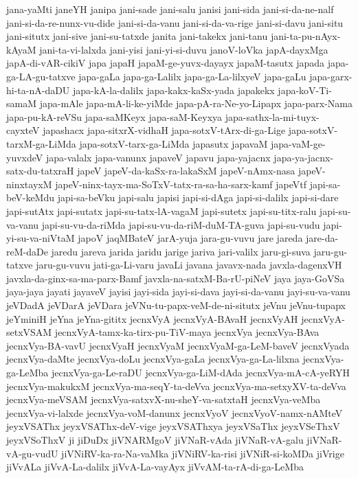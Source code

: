 {jana-yaMti
janeYH
janipa
jani-sade
jani-salu
janisi
jani-sida
jani-si-da-ne-nalf
jani-si-da-re-nunx-vu-dide
jani-si-da-vanu
jani-si-da-va-rige
jani-si-davu
jani-situ
jani-situtx
jani-sive
jani-su-tatxde
janita
jani-takekx
jani-tanu
jani-ta-pu-nAyx-kAyaM
jani-ta-vi-lalxda
jani-yisi
jani-yi-si-duvu
janoV-loVka
japA-dayxMga
japA-di-vAR-cikiV
japa
japaH
japaM-ge-yuvx-dayayx
japaM-tasutx
japada
japa-ga-LA-gu-tatxve
japa-gaLa
japa-ga-Lalilx
japa-ga-La-lilxyeV
japa-gaLu
japa-garx-hi-ta-nA-daDU
japa-kA-la-dalilx
japa-kakx-kaSx-yada
japakekx
japa-koV-Ti-samaM
japa-mAle
japa-mA-li-ke-yiMde
japa-pA-ra-Ne-yo-Lipapx
japa-parx-Nama
japa-pu-kA-reVSu
japa-saMKeyx
japa-saM-Keyxya
japa-sathx-la-mi-tuyx-cayxteV
japashacx
japa-sitxrX-vidhaH
japa-sotxV-tArx-di-ga-Lige
japa-sotxV-tarxM-ga-LiMda
japa-sotxV-tarx-ga-LiMda
japasutx
japavaM
japa-vaM-ge-yuvxdeV
japa-valalx
japa-vanunx
japaveV
japavu
japa-yajacnx
japa-ya-jacnx-satx-du-tatxraH
japeV
japeV-da-kaSx-ra-lakaSxM
japeV-nAmx-nasa
japeV-ninxtayxM
japeV-ninx-tayx-ma-SoTxV-tatx-ra-sa-ha-sarx-kamf
japeVtf
japi-sa-beV-keMdu
japi-sa-beVku
japi-salu
japisi
japi-si-dAga
japi-si-dalilx
japi-si-dare
japi-sutAtx
japi-sutatx
japi-su-tatx-lA-vagaM
japi-sutetx
japi-su-titx-ralu
japi-su-va-vanu
japi-su-vu-da-riMda
japi-su-vu-da-riM-duM-TA-guva
japi-su-vudu
japi-yi-su-va-niVtaM
japoV
jaqMBateV
jarA-yuja
jara-gu-vuvu
jare
jareda
jare-da-reM-daDe
jaredu
jareva
jarida
jaridu
jarige
jariva
jari-valilx
jaru-gi-suva
jaru-gu-tatxve
jaru-gu-vuvu
jati-ga-Li-varu
javaLi
javana
javavx-nada
javxla-dagenxVH
javxla-da-ginx-sa-ma-parx-Bamf
javxla-na-satxM-Ba-rU-piNeV
jaya
jaya-GoVSa
jaya-jaya
jayati
jayaveV
jayisi
jayi-sida
jayi-si-dava
jayi-si-da-vanu
jayi-su-va-vanu
jeVDadA
jeVDarA
jeVDara
jeVNu-tu-papx-veM-de-ni-situtx
jeVnu
jeVnu-tupapx
jeYminiH
jeYna
jeYna-gititx
jecnxVyA
jecnxVyA-BAvaH
jecnxVyAH
jecnxVyA-setxVSAM
jecnxVyA-tamx-ka-tirx-pu-TiV-maya
jecnxVya
jecnxVya-BAva
jecnxVya-BA-vavU
jecnxVyaH
jecnxVyaM
jecnxVyaM-ga-LeM-baveV
jecnxVyada
jecnxVya-daMte
jecnxVya-doLu
jecnxVya-gaLa
jecnxVya-ga-La-lilxna
jecnxVya-ga-LeMba
jecnxVya-ga-Le-raDU
jecnxVya-ga-LiM-dAda
jecnxVya-mA-cA-yeRYH
jecnxVya-makukxM
jecnxVya-ma-seqY-ta-deVva
jecnxVya-ma-setxyXV-ta-deVva
jecnxVya-meVSAM
jecnxVya-satxvX-nu-sheY-va-satxtaH
jecnxVya-veMba
jecnxVya-vi-lalxde
jecnxVya-voM-danunx
jecnxVyoV
jecnxVyoV-namx-nAMteV
jeyxVSAThx
jeyxVSAThx-deV-vige
jeyxVSAThxya
jeyxVSaThx
jeyxVSeThxV
jeyxVSoThxV
ji
jiDuDx
jiVNARMgoV
jiVNaR-vAda
jiVNaR-vA-galu
jiVNaR-vA-gu-vudU
jiVNiRV-ka-ra-Na-vaMka
jiVNiRV-ka-risi
jiVNiR-si-koMDa
jiVrige
jiVvALa
jiVvA-La-dalilx
jiVvA-La-vayAyx
jiVvAM-ta-rA-di-ga-LeMba
}
